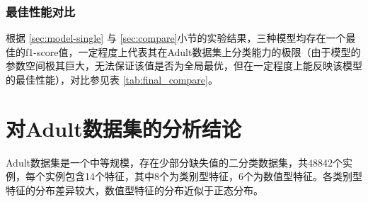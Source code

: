 \documentclass[12pt,a4paper]{article}
\theoremstyle{definition}
\begin{document}
\subsubsection{最佳性能对比}

根据 \ref{sec:model-single} 与 \ref{sec:compare}小节的实验结果，三种模型均存在一个最佳的f1-score值，一定程度上代表其在Adult数据集上分类能力的极限（由于模型的参数空间极其巨大，无法保证该值是否为全局最优，但在一定程度上能反映该模型的最佳性能），对比参见表 \ref{tab:final_compare}。


\section{对Adult数据集的分析结论}

Adult数据集是一个中等规模，存在少部分缺失值的二分类数据集，共48842个实例，每个实例包含14个特征，其中8个为类别型特征，6个为数值型特征。各类别型特征的分布差异较大，数值型特征的分布近似于正态分布。
\end{document}
